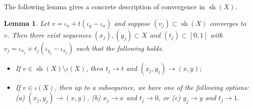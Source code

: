 \documentclass{amsart}
\newtheorem{lemma}[theorem]{Lemma}
\numberwithin{equation}{section}
\newcommand{\sh}{\operatorname{sh}}
\begin{document}
The following lemma gives a concrete description of convergence in $\sh(X)$.
\begin{lemma}\label{lem:sh-conv}
    Let $v=\iota_{x}+t(\iota_{y}-\iota_{x})$ and suppose $(v_j)\subset \sh(X)$ converges to $v$. Then there exist sequences $(x_j),(y_j)\subset X$ and $(t_j)\subset [0,1]$ with $v_j=\iota_{x_j}+t_j(\iota_{y_j}-\iota_{x_j})$ such that the following holds.
    \begin{itemize}
        \item[(1)] If $v\in \sh(X)\setminus\iota(X)$, then $t_j\to t$ and $(x_j,y_j)\to (x,y)$;
        \item[(2)] If $v\in\iota(X)$, then up to a subsequence, we have one of the following options: (a) $(x_j,y_j)\to (x,y)$, (b) $x_j\to x $ and $t_j\to 0$, or (c) $y_j\to y$ and $t_j\to 1$.
    \end{itemize}
\end{lemma}
\end{document}
